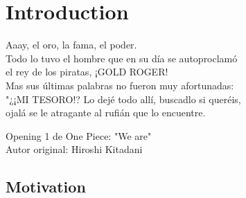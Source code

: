 % 
% 
% 
% 
% 
% 
% 

\chapter{Introduction}
\label{cha:introduction}

\begin{FraseCelebre}
  \begin{Frase}
    Aaay, el oro, la fama, el poder.  \\
    Todo lo tuvo el hombre que en su día se autoproclamó  \\
    el rey de los piratas, ¡GOLD ROGER!  \\
    Mas sus últimas palabras no fueron muy afortunadas:  \\
    "¿¡MI TESORO!? Lo dejé todo allí, buscadlo si queréis,  \\
    ojalá se le atragante al rufián que lo encuentre.
  \end{Frase}
  \begin{Fuente}
    Opening 1 de One Piece: "We are" \\
    Autor original: Hiroshi Kitadani
  \end{Fuente}
\end{FraseCelebre}

\section{Motivation}
\label{sec:1_motivation}

